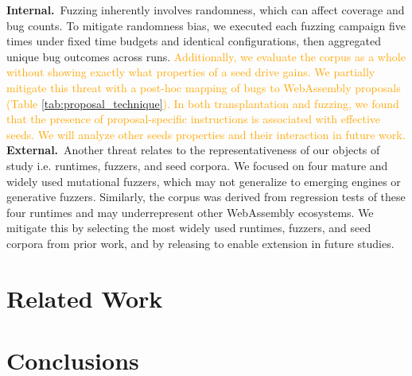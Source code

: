 \documentclass[lettersize,journal]{IEEEtran}
\begin{document}
\noindent \textbf{Internal.}~Fuzzing inherently involves randomness, which can affect coverage and bug counts. To mitigate randomness bias, we executed each fuzzing campaign five times under fixed time budgets and identical configurations, then aggregated unique bug outcomes across runs. \textcolor{orange}{Additionally, we evaluate the corpus as a whole without showing exactly what properties of a seed drive gains. We partially mitigate this threat with a post-hoc mapping of bugs to WebAssembly proposals (Table \ref{tab:proposal_technique}). In both transplantation and fuzzing, we found that the presence of proposal-specific instructions is associated with effective seeds. We will analyze other seeds properties and their interaction in future work.}
\noindent \textbf{External.}~Another threat relates to the representativeness of our objects of study i.e. runtimes, fuzzers, and seed corpora. We focused on four mature and \fuzzercount{} widely used mutational fuzzers, which may not generalize to emerging engines or generative fuzzers. Similarly, the \tname{} corpus was derived from regression tests of these four runtimes and may underrepresent other WebAssembly ecosystems. We mitigate this by selecting the most widely used runtimes, fuzzers, and seed corpora from prior work, and by releasing \tname{} to enable extension in future studies.

\section{Related Work}

\label{sec:relatedwork}


\section{Conclusions}
\label{sec:conclusions}
\end{document}
